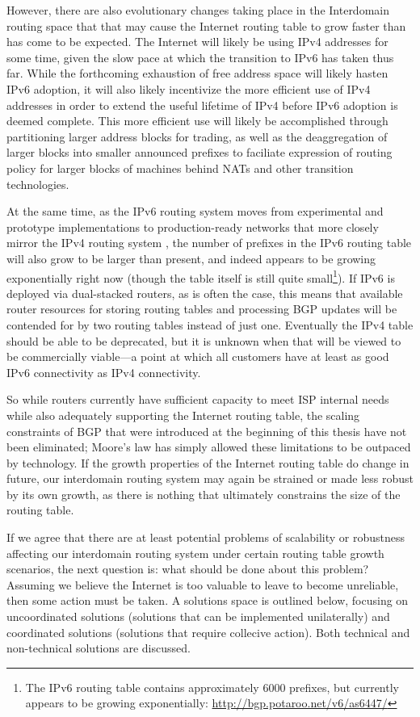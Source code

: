 However, there are also evolutionary changes taking place in the Interdomain
routing space that that may cause the Internet routing table to grow faster
than has come to be expected. The Internet will likely be using IPv4 addresses
for some time, given the slow pace at which the transition to IPv6 has taken
thus far. While the forthcoming exhaustion of free address space will likely
hasten IPv6 adoption, it will also likely incentivize the more efficient use of
IPv4 addresses in order to extend the useful lifetime of IPv4 before IPv6
adoption is deemed complete. This more efficient use will likely be
accomplished through partitioning larger address blocks for trading, as well as
the deaggregation of larger blocks into smaller announced prefixes to faciliate
expression of routing policy for larger blocks of machines behind NATs and
other transition technologies.

At the same time, as the IPv6 routing system moves from experimental and
prototype implementations to production-ready networks that more closely mirror
the IPv4 routing system \cite{Cowie:2010vn}, the number of prefixes in the IPv6
routing table will also grow to be larger than present, and indeed appears to
be growing exponentially right now (though the table itself is still quite
small\footnote{The IPv6 routing table contains approximately 6000 prefixes, but
currently appears to be growing exponentially:
\url{http://bgp.potaroo.net/v6/as6447/}}). If IPv6 is deployed via
dual-stacked routers, as is often the case, this means that available router
resources for storing routing tables and processing BGP updates will be
contended for by two routing tables instead of just one. Eventually the IPv4
table should be able to be deprecated, but it is unknown when that will be
viewed to be commercially viable---a point at which all customers have at least
as good IPv6 connectivity as IPv4 connectivity.

So while routers currently have sufficient capacity to meet ISP internal needs
while also adequately supporting the Internet routing table, the scaling
constraints of BGP that were introduced at the beginning of this thesis have
not been eliminated; Moore's law has simply allowed these limitations to be
outpaced by technology. If the growth properties of the Internet routing table
do change in future, our interdomain routing system may again be strained or
made less robust by its own growth, as there is nothing that ultimately
constrains the size of the routing table.

If we agree that there are at least potential problems of scalability or
robustness affecting our interdomain routing system under certain routing table
growth scenarios, the next question is: what should be done about this problem?
Assuming we believe the Internet is too valuable to leave to become unreliable,
then some action must be taken. A solutions space is outlined below, focusing
on uncoordinated solutions (solutions that can be implemented unilaterally) and
coordinated solutions (solutions that require collecive action). Both technical
and non-technical solutions are discussed.

